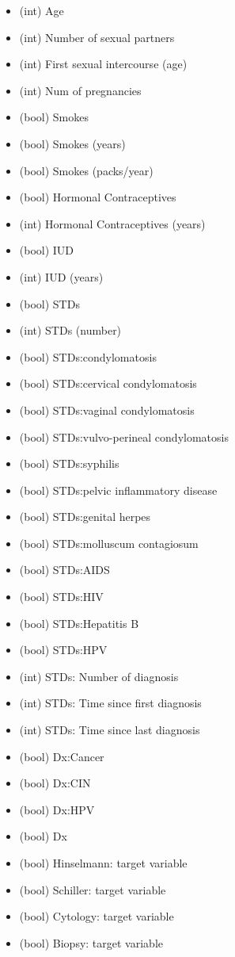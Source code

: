 \documentclass[12pt,]{krantz}
\providecommand{\tightlist}{%
  \setlength{\itemsep}{0pt}\setlength{\parskip}{0pt}}
\theoremstyle{definition}
\theoremstyle{definition}
\theoremstyle{definition}
\theoremstyle{remark}
\begin{document}
\begin{itemize}
\tightlist
\item
  (int) Age
\item
  (int) Number of sexual partners
\item
  (int) First sexual intercourse (age)
\item
  (int) Num of pregnancies
\item
  (bool) Smokes
\item
  (bool) Smokes (years)
\item
  (bool) Smokes (packs/year)
\item
  (bool) Hormonal Contraceptives
\item
  (int) Hormonal Contraceptives (years)
\item
  (bool) IUD
\item
  (int) IUD (years)
\item
  (bool) STDs
\item
  (int) STDs (number)
\item
  (bool) STDs:condylomatosis
\item
  (bool) STDs:cervical condylomatosis
\item
  (bool) STDs:vaginal condylomatosis
\item
  (bool) STDs:vulvo-perineal condylomatosis
\item
  (bool) STDs:syphilis
\item
  (bool) STDs:pelvic inflammatory disease
\item
  (bool) STDs:genital herpes
\item
  (bool) STDs:molluscum contagiosum
\item
  (bool) STDs:AIDS
\item
  (bool) STDs:HIV
\item
  (bool) STDs:Hepatitis B
\item
  (bool) STDs:HPV
\item
  (int) STDs: Number of diagnosis
\item
  (int) STDs: Time since first diagnosis
\item
  (int) STDs: Time since last diagnosis
\item
  (bool) Dx:Cancer
\item
  (bool) Dx:CIN
\item
  (bool) Dx:HPV
\item
  (bool) Dx
\item
  (bool) Hinselmann: target variable
\item
  (bool) Schiller: target variable
\item
  (bool) Cytology: target variable
\item
  (bool) Biopsy: target variable
\end{itemize}
\end{document}
